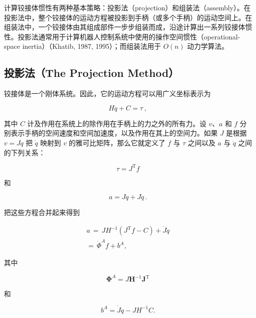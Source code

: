 \documentclass[10pt,a4paper]{book}
\theoremstyle{thmstyle} %
\theoremstyle{defstyle} %
\theoremstyle{prostyle} %
\begin{document}
计算铰接体惯性有两种基本策略：投影法（projection）和组装法（assembly）。在投影法中，整个铰接体的运动方程被投影到手柄（或多个手柄）的运动空间上。在组装法中，一个铰接体由其组成部件一步步组装而成，沿途计算出一系列铰接体惯性。投影法通常用于计算机器人控制系统中使用的操作空间惯性（operational-space inertia）（Khatib, 1987, 1995）；而组装法用于 $O(n)$ 动力学算法。



\subsection{投影法（The Projection Method）}





铰接体是一个刚体系统。因此，它的运动方程可以用广义坐标表示为



$$
H \ddot { q } + C = \tau \ ,
$$



其中 $C$ 计及作用在系统上的除作用在手柄上的力之外的所有力。设 $v$、$a$ 和 $f$ 分别表示手柄的空间速度和空间加速度，以及作用在其上的空间力。如果 $J$ 是根据 $v = J\dot{q}$ 把 $\dot{q}$ 映射到 $v$ 的雅可比矩阵，那么它就定义了 $f$ 与 $\tau$ 之间以及 $a$ 与 $\ddot{q}$ 之间的下列关系：



$$
\tau = J ^{\mathrm { T} } f
$$



和



$$
a = J \ddot { q } + J \dot { q } \, .
$$



把这些方程合并起来得到



$$
\begin{array}{r} { a \, = \, J H ^{- 1} ( J ^{\mathrm { T} } f - C ) + \dot { J } \dot { q } } \\{ = \, \dot { \Phi } ^{A} f + b ^{A} , } \end{array}
$$



其中



$$
\boldsymbol { \Phi } ^{A} = J \boldsymbol { H } ^{- 1} \boldsymbol { J } ^{\mathrm { T} }
$$



和



$$
b ^{A} = \dot { J } \dot { q } - J H ^{- 1} C .
$$
\end{document}
